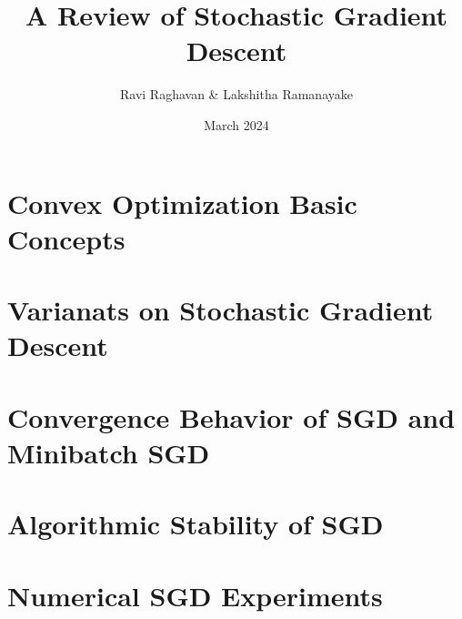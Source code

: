 \documentclass{article}
\title{A Review of Stochastic Gradient Descent}
\author{Ravi Raghavan \& Lakshitha Ramanayake}
\date{March 2024}
\begin{document}
 

\maketitle

\section{Convex Optimization Basic Concepts}

\pagebreak
\section{Varianats on Stochastic Gradient Descent}

\pagebreak
\section{Convergence Behavior of SGD and Minibatch SGD}

\pagebreak
\section{Algorithmic Stability of SGD}

\pagebreak
\section{Numerical SGD Experiments}

\end{document}
